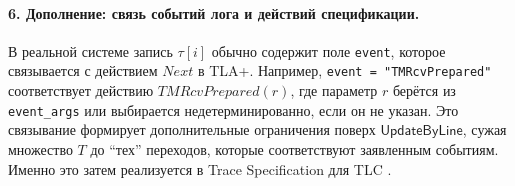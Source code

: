 \paragraph{6. Дополнение: связь событий лога и действий спецификации.}
В реальной системе запись $\tau[i]$ обычно содержит поле \texttt{event},
которое связывается с действием $\mathit{Next}$ в TLA+.
Например, \texttt{event = "TMRcvPrepared"} соответствует действию
$TMRcvPrepared(r)$, где параметр $r$ берётся из \texttt{event\_args}
или выбирается недетерминированно, если он не указан.
Это связывание формирует дополнительные ограничения поверх $\mathsf{UpdateByLine}$,
сужая множество $T$ до ``тех'' переходов, которые соответствуют заявленным событиям.
Именно это затем реализуется в Trace Specification для TLC
\cite{CirsteaKuppeLoillierMerz2024}.

